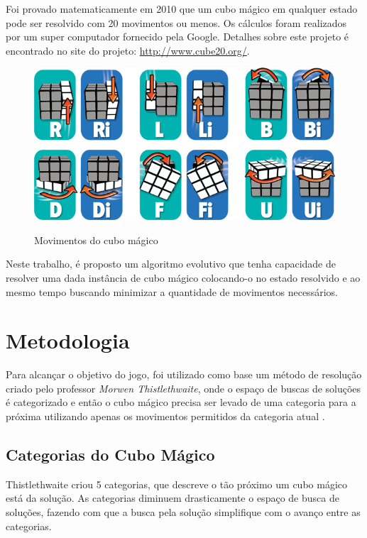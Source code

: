 \documentclass[12pt]{article}
\begin{document}
  Foi provado matematicamente em 2010 que um cubo mágico em qualquer estado pode ser resolvido com 20 movimentos ou menos. Os cálculos foram realizados por um super computador fornecido pela Google. Detalhes sobre este projeto é encontrado no site do projeto: \url{http://www.cube20.org/}.

  \begin{figure}[!ht]
    \centering
    \caption{Movimentos do cubo mágico}
    \includegraphics[scale=1.8]{images/moves.png}
    \label{fig:moves}
  \end{figure}

  Neste trabalho, é proposto um algoritmo evolutivo que tenha capacidade de resolver uma dada instância de cubo mágico colocando-o no estado resolvido e ao mesmo tempo buscando minimizar a quantidade de movimentos necessários.

\section{Metodologia}
  Para alcançar o objetivo do jogo, foi utilizado como base um método de resolução criado pelo professor \textit{Morwen Thistlethwaite}, onde o espaço de buscas de soluções é categorizado e então o cubo mágico precisa ser levado de uma categoria para a próxima utilizando apenas os movimentos permitidos da categoria atual \cite{thistlethwaite}.

  \subsection{Categorias do Cubo Mágico}
    Thistlethwaite criou 5 categorias, que descreve o tão próximo um cubo mágico está da solução. As categorias diminuem drasticamente o espaço de busca de soluções, fazendo com que a busca pela solução simplifique com o avanço entre as categorias.
\end{document}
